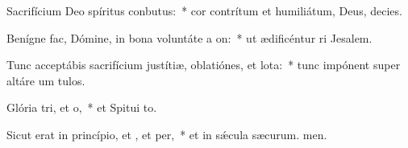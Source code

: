 \item Sacrifícium Deo spíritus conbutus:~* cor contrítum et humiliátum, Deus,  decies.
\item Benígne fac, Dómine, in bona voluntáte a on:~* ut ædificéntur ri Jesalem.
\item Tunc acceptábis sacrifícium justítiæ, oblatiónes, et lota:~* tunc impónent super altáre um tulos.
\item Glória tri, et o,~* et Spitui to.
\item Sicut erat in princípio, et , et per,~* et in sǽcula sæcurum. men.
